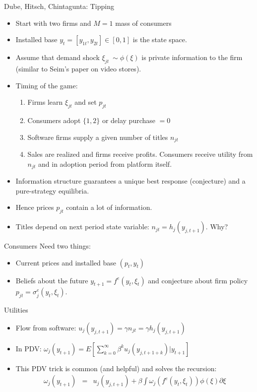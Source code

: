 \documentclass[xcolor=pdftex,dvipsnames,table,mathserif]{beamer}
\begin{document}
\begin{frame}{Dube, Hitsch, Chintagunta: Tipping}

\begin{itemize}
\item Start with two firms and $M=1$ mass of consumers
\item Installed base $y_{t} = [y_{1t},y_{2t}] \in [0,1]$ is the state space.
\item Assume that demand shock $\xi_{jt}~\sim \phi(\xi)$ is private information to the firm (similar to Seim's paper on video stores).
\item Timing of the game:
\begin{enumerate}
\item Firms learn $\xi_{jt}$ and set $p_{jt}$
\item Consumers adopt $\{1,2\}$ or delay purchase $=0$
\item Software firms supply a given number of titles $n_{jt}$
\item Sales are realized and firms receive profits. Consumers receive utility from $n_{jt}$ and in adoption period from platform itself.
\end{enumerate}
\item Information structure guarantees a unique best response (conjecture) and a pure-strategy equilibria.
\item Hence prices $p_{jt}$ contain a lot of information.
\end{itemize}
\end{frame}



\begin{frame}{}

\begin{itemize}
\item Titles depend on next period state variable: $n_{jt} = h_j(y_{j,t+1})$. Why?
\end{itemize}
\end{frame}

\begin{frame}{Consumers}
Need two things:
\begin{itemize}
\item Current prices and installed base $(p_t, y_t)$
\item Beliefs about the future $y_{t+1} = f^e(y_t,\xi_t)$ and conjecture about firm policy $p_{jt} = \sigma_j^e(y_t,\xi_t)$.
\end{itemize}
Utilities
\begin{itemize}
\item Flow from software: $u_j(y_{j,t+1}) = \gamma n_{jt} = \gamma h_j (y_{j,t+1})$
\item In PDV: $\omega_j (y_{t+1}) = E [ \sum_{k=0}^{\infty} \beta^k u_j(y_{j,t+1+k}) | y_{t+1}]$
\item This PDV trick is common (and helpful) and solves the recursion:
\begin{eqnarray*}
\omega_j(y_{t+1}) &=& u_j(y_{j,t+1}) + \beta \int  \omega_j( f^e(y_t,\xi_t)) \phi(\xi) \partial \xi\\
\end{eqnarray*}
\end{itemize}
\end{frame}
\end{document}
